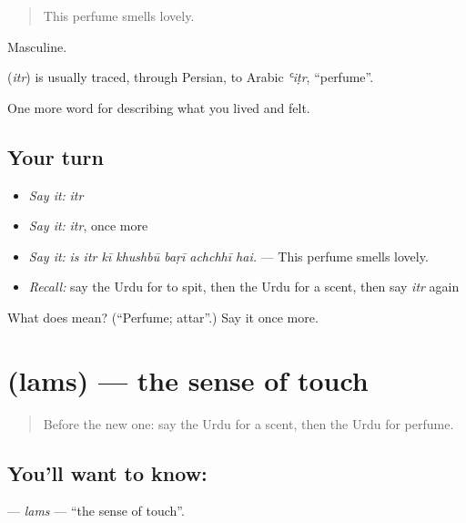 \begin{quote}
This perfume smells lovely.
\end{quote}

Masculine.

\begin{cousinweb}
\textbf{} (\emph{itr}) is usually traced, through Persian, to Arabic \emph{ʿiṭr}, \textquotedblleft{}perfume\textquotedblright{}.
\end{cousinweb}

\begin{grammarlens}[title={What you've built}]
One more word for describing what you lived and felt.
\end{grammarlens}

\subsection*{Your turn}
\begin{itemize}
\raggedright
  \item \emph{Say it:} \emph{itr}
  \item \emph{Say it:} \emph{itr}, once more
  \item \emph{Say it:} \emph{is itr kī khushbū baṛī achchhī hai.} — This perfume smells lovely.
  \item \emph{Recall:} say the Urdu for to spit, then the Urdu for a scent, then say \emph{itr} again
\end{itemize}

\begin{tcolorbox}[breakable,colback=teal!4,colframe=teal!35!black,title={Before you move on}]
What does  mean? (\textquotedblleft{}Perfume; attar\textquotedblright{}.) Say it once more.
\end{tcolorbox}
\section[\texorpdfstring{\ur{لمس} (lams)}{لمس (lams)}]{ (lams) — the sense of touch}

\label{lesson:UR-C468-lams}



\begin{quote}
Before the new one: say the Urdu for a scent, then the Urdu for perfume.
\end{quote}

\subsection*{You'll want to know: }
\textbf{} — \emph{lams} — \textquotedblleft{}the sense of touch\textquotedblright{}.

